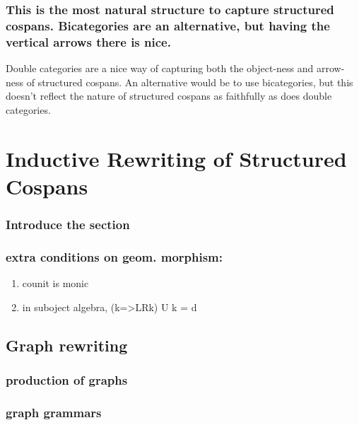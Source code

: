 \documentclass{amsart}
\theoremstyle{remark}
\theoremstyle{definition}
\begin{document}
\subsubsection{This is the most natural structure to capture structured cospans. Bicategories are an alternative, but having the vertical arrows there is nice.}
\label{sec-2-4-2}

Double categories are a nice way of capturing both the object-ness and
arrow-ness of structured cospans.  An alternative would be to use
bicategories, but this doesn't reflect the nature of structured
cospans as faithfully as does double categories.


\section{Inductive Rewriting of Structured Cospans}
\label{sec-3}

\subsubsection{Introduce the section}
\label{sec-3-1}

\subsubsection{extra conditions on geom. morphism:}
\label{sec-3-1-1}
\begin{enumerate}
\item counit is monic
\label{sec-3-1-1-1}
\item in suboject algebra, (k=>LRk) U k = d
\label{sec-3-1-1-2}
\end{enumerate}


\subsection{Graph rewriting}
\label{sec-3-2}

\subsubsection{production of graphs}
\label{sec-3-2-1}
\subsubsection{graph grammars}
\label{sec-3-2-2}
\end{document}

